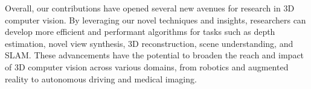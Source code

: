 Overall, our contributions have opened several new avenues for research in 3D computer vision. By leveraging our novel techniques and insights, researchers can develop more efficient and performant algorithms for tasks such as depth estimation, novel view synthesis, 3D reconstruction, scene understanding, and SLAM. These advancements have the potential to broaden the reach and impact of 3D computer vision across various domains, from robotics and augmented reality to autonomous driving and medical imaging.